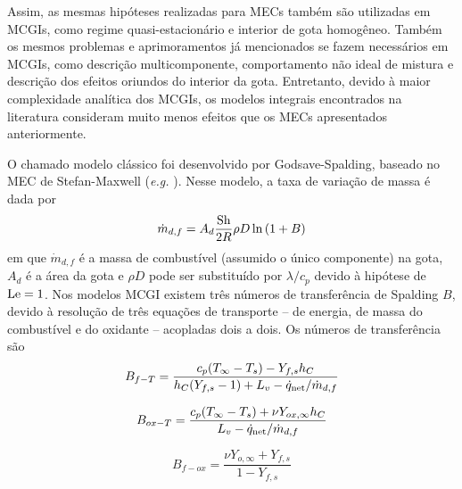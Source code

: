Assim, as mesmas hipóteses realizadas para MECs também são utilizadas em MCGIs, como regime quasi-estacionário e interior de gota homogêneo.
Também os mesmos problemas e aprimoramentos já mencionados se fazem necessários em MCGIs, como descrição multicomponente, comportamento não ideal de mistura e  
descrição dos efeitos oriundos do interior da gota.
Entretanto, devido à maior complexidade analítica dos MCGIs, os modelos integrais encontrados na literatura consideram muito menos efeitos que os MECs apresentados anteriormente.

O chamado modelo clássico foi desenvolvido por Godsave-Spalding, baseado no MEC de Stefan-Maxwell (\emph{e.g.} \cite{Glassman2008,Law2006,Turns2000}).
Nesse modelo, a taxa de variação de massa é dada por
\begin{equation}
    \dot m_{d,f} = A_d \frac{\mathrm{Sh}}{2R} \rho D \ln{(1 + B)} \label{eq:m_evap_B_M_2}
\end{equation}
em que $\dot m_{d,f}$ é a massa de combustível (assumido o único componente) na gota, $A_d$ é a área da gota e $\rho D$ pode ser substituído por $\lambda/c_p$ devido à hipótese de $\mathrm{Le}=1$.
Nos modelos MCGI existem três números de transferência de Spalding $B$, devido à resolução de três equações de transporte -- de energia, de massa do combustível e do oxidante -- acopladas dois a dois.
Os números de transferência são
\vspace{-6pt}
\begin{align}
    B_{f-T}  = \frac{c_p(T_\infty - T_s) - Y_{f,s} h_C}{h_C(Y_{f,s} - 1) + L_v - \dot q_{\mathrm{net}}/\dot m_{d,f}} \label{eq:B_fq}
\end{align}
\vspace{-6pt}

\begin{minipage}{0.5\linewidth}
    \begin{equation}
        B_{ox-T} = \frac{c_p(T_\infty - T_s) + \nu Y_{ox,\infty}h_C}{L_v  - \dot q_{\mathrm{net}}/\dot m_{d,f}} \label{eq:B_oq}\\
    \end{equation}
\end{minipage}
\hspace{0.05\textwidth}
\begin{minipage}{0.4\linewidth}
    \begin{equation}
        B_{f-ox} = \frac{\nu Y_{o,\infty} + Y_{f,s}}{1 - Y_{f,s}} \label{eq:B_fo}
    \end{equation}
\end{minipage}
\vspace{0pt}

